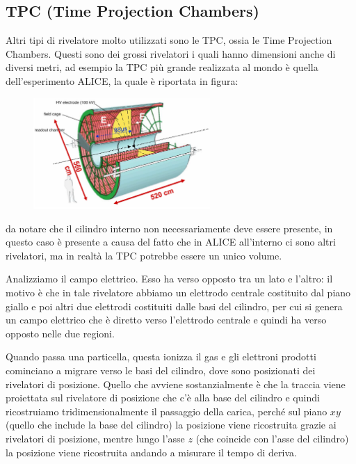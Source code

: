 \subsection{TPC (Time Projection Chambers)}

Altri tipi di rivelatore molto utilizzati sono le TPC, ossia le Time Projection Chambers. Questi sono dei grossi rivelatori i quali hanno dimensioni anche di diversi metri, ad esempio la TPC più grande realizzata al mondo è quella dell'esperimento ALICE, la quale è riportata in figura:
\begin{figure}[H]
   \centering
   \includegraphics[width=0.6\textwidth]{immagini/TPC_1.png}
\end{figure}
\E da notare che il cilindro interno non necessariamente deve essere presente, in questo caso è presente a causa del fatto che in ALICE all'interno ci sono altri rivelatori, ma in realtà la TPC potrebbe essere un unico volume.

Analizziamo il campo elettrico. Esso ha verso opposto tra un lato e l'altro: il motivo è che in tale rivelatore abbiamo un elettrodo centrale costituito dal piano giallo e poi altri due elettrodi costituiti dalle basi del cilindro, per cui si genera un campo elettrico che è diretto verso l'elettrodo centrale e quindi ha verso opposto nelle due regioni. 

Quando passa una particella, questa ionizza il gas e gli elettroni prodotti cominciano a migrare verso le basi del cilindro, dove sono posizionati dei rivelatori di posizione. Quello che avviene sostanzialmente è che la traccia viene proiettata sul rivelatore di posizione che c'è alla base del cilindro e quindi ricostruiamo tridimensionalmente il passaggio della carica, perché sul piano $xy$ (quello che include la base del cilindro) la posizione viene ricostruita grazie ai rivelatori di posizione, mentre lungo l'asse $z$ (che coincide con l'asse del cilindro) la posizione viene ricostruita andando a misurare il tempo di deriva.

